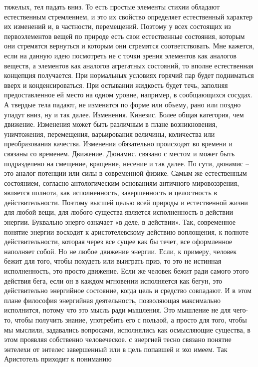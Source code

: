 тяжелых, тел падать вниз. То есть простые элементы стихии обладают естественным
стремлением, и это их свойство определяет естественный характер их изменений и,
в частности, перемещений. Поэтому у всех состоящих из первоэлементов вещей по
природе есть свои естественные состояния, которым они стремятся вернуться и
которым они стремятся соответствовать. Мне кажется, если на данную идею
посмотреть не с точки зрения элементов как аналогов веществ, а элементов как
аналогов агрегатных состояний, то вполне естественная концепция получается. При
нормальных условиях горячий пар будет подниматься вверх и конденсироваться. При
остывании жидкость будет течь, заполняя предоставленное ей место на одном
уровне, например, в сообщающихся сосудах. А твердые тела падают, не изменятся по
форме или объему, рано или поздно упадут вниз, ну и так далее. Изменения.
Кинезис. Более общая категория, чем движение. Изменения может быть различным в
плане возникновения, уничтожения, перемещения, варьирования величины, количества
или преобразования качества. Изменения обязательно происходят во времени и
связаны со временем. Движение. Дюнамис. связано с местом и может быть
подразделено на смещение, вращение, несение и так далее. По сути, дюнамис – это
аналог потенции или силы в современной физике. Самым же естественным состоянием,
согласно антологическим основаниям античного мировоззрения, является полнота,
как исполненность, завершенность и целостность в действительности. Поэтому
высшей целью всей природы и естественной жизни для любой вещи, для любого
существа является исполненность в действии энергии. Буквально энерго означает «в
деле, в действии». Так, современное понятие энергии восходит к аристотелевскому
действию воплощения, к полноте действительности, которая через все сущее как бы
течет, все оформленное наполняет собой. Но не любое движение энергии. Если, к
примеру, человек бежит для того, чтобы похудеть или выиграть приз, то это не
истинная исполненность, это просто движение. Если же человек бежит ради самого
этого действия бега, если он в каждом мгновении исполняется как бегун, это
действительно энергийное состояние, когда цель и средство совпадают. И в этом
плане философия энергийная деятельность, позволяющая максимально исполнится,
потому что это мысль ради мышления. Это мышление не для чего-то, чтобы получить
знание, употребить его с пользой, а просто для того, чтобы мы мыслили,
задавались вопросами, исполнялись как осмысляющие существа, в этом проявляя
собственно человеческое. с энергией тесно связано понятие энтелехи от энтелес
завершенный или в цель попавшей и эхо имеем. Так Аристотель приходит к пониманию
